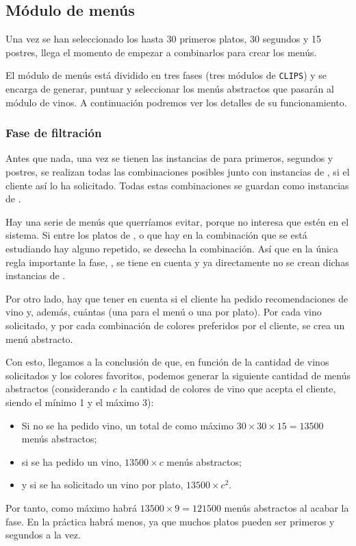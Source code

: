 % 

\subsection{Módulo de menús}
Una vez se han seleccionado los hasta 30 primeros platos, 30 segundos y 15
postres, llega el momento de empezar a combinarlos para crear los menús.

El módulo de menús está dividido en tres fases (tres módulos de \texttt{CLIPS})
y se encarga de generar, puntuar y seleccionar los menús abstractos que pasarán
al módulo de vinos. A continuación podremos ver los detalles de su
funcionamiento.

\subsubsection{Fase de filtración}
Antes que nada, una vez se tienen las instancias de  para
primeros, segundos y postres, se realizan todas las combinaciones posibles
junto con instancias de , si el cliente así lo ha
solicitado. Todas estas combinaciones se guardan como instancias de
.

Hay una serie de menús que querríamos evitar, porque no interesa que estén en
el sistema. Si entre los platos de ,  o
 que hay en la combinación que se está estudiando hay alguno
repetido, se desecha la combinación. Así que en la única regla importante la
fase, , se tiene en cuenta y ya directamente no se crean
dichas instancias de .

Por otro lado, hay que tener en cuenta si el cliente ha pedido recomendaciones
de vino y, además, cuántas (una para el menú o una por plato). Por cada vino
solicitado, y por cada combinación de colores preferidos por el cliente, se
crea un menú abstracto.

Con esto, llegamos a la conclusión de que, en función de la cantidad de vinos
solicitados y los colores favoritos, podemos generar la siguiente cantidad de
menús abstractos (considerando $c$ la cantidad de colores de vino que acepta el cliente, siendo el mínimo 1 y el máximo 3):
\begin{itemize}
\item Si no se ha pedido vino, un total de como máximo $30 \times 30 \times 15
  = 13500$ menús abstractos;
\item si se ha pedido un vino, $13500 \times c$ menús abstractos;
\item y si se ha solicitado un vino por plato, $13500 \times c^2$.
\end{itemize}

Por tanto, como máximo habrá $13500 \times 9 = 121500$ menús abstractos al
acabar la fase. En la práctica habrá menos, ya que muchos platos pueden ser
primeros y segundos a la vez.


